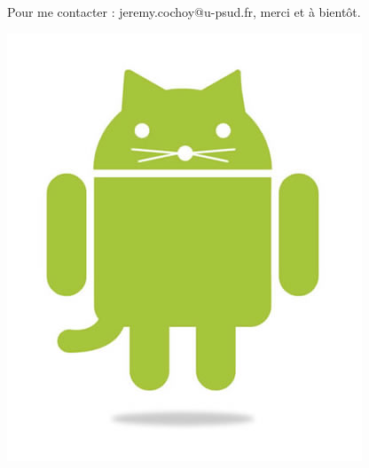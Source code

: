 \documentclass{beamer}
\begin{document}
\begin{frame}
\begin{center}
Pour me contacter : jeremy.cochoy@u-psud.fr, merci et à bientôt.

\medskip
\medskip
\medskip
\medskip

\includegraphics[scale=0.3]{android_cat.jpg}
\end{center}
\end{frame}
\end{document}
